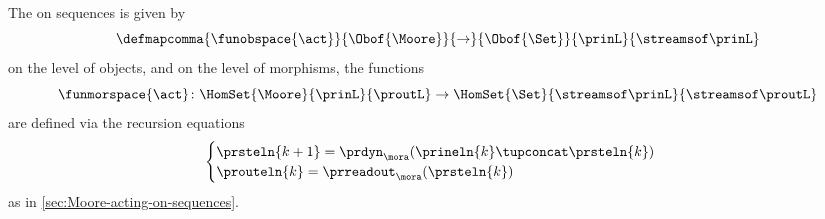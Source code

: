 \begin{definition}
    \label{def:moore-standard-action-on-sequences}
    The  on sequences is given by
    \begin{equation}
        \defmapcomma{\funobspace{\act}}
        {\Obof{\Moore}}
        {\to}
        {\Obof{\Set}}
        {\prinL}
        {\streamsof\prinL}
    \end{equation}
    on the level of objects, and on the level of morphisms, the functions
    \begin{equation}
        \funmorspace{\act} \colon  \HomSet{\Moore}{\prinL}{\proutL} \to \HomSet{\Set}{\streamsof\prinL }{\streamsof\proutL}
    \end{equation}
    are defined via the recursion equations
    \begin{equation}
        \begin{cases}
            \prsteln{k+1} = \prdyn_\mora(\prineln{k} \tupconcat \prsteln{k}) \\
            \prouteln{k}   = \prreadout_\mora(\prsteln{k})
        \end{cases}
    \end{equation}
    as in \cref{sec:Moore-acting-on-sequences}.
\end{definition}

